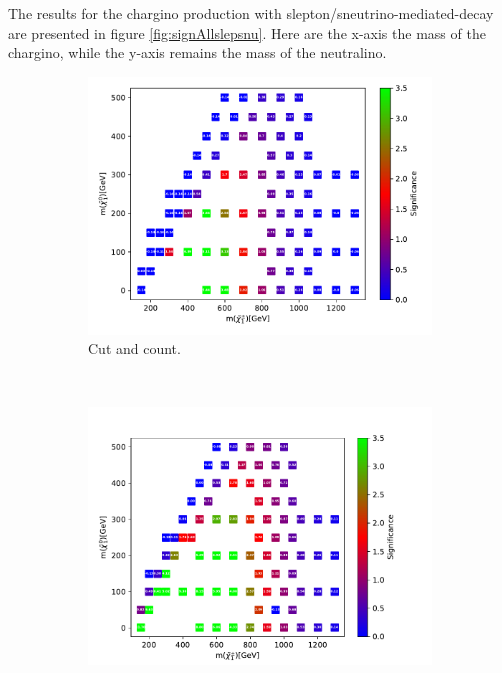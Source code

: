 The results for the chargino production with slepton/sneutrino-mediated-decay are presented in figure \ref{fig:signAllslepsnu}. Here are the x-axis the mass of the chargino, while the y-axis remains the mass of the neutralino.

\begin{figure}[H]
    \centering
    \begin{subfigure}[t!]{0.49\textwidth}
    \includegraphics[width = \textwidth]{Figures/Significances/significanceCutandCount_slepsnu_all.pdf}
    \caption{Cut and count.}
        \label{fig:signAllslepsnucandc}
    \end{subfigure}
    \\
    \begin{subfigure}[t!]{0.49\textwidth}
    \includegraphics[width = \textwidth]{Figures/Significances/significance_BDT_slepsnu_All_level.pdf}

\end{subfigure}
\end{figure}
